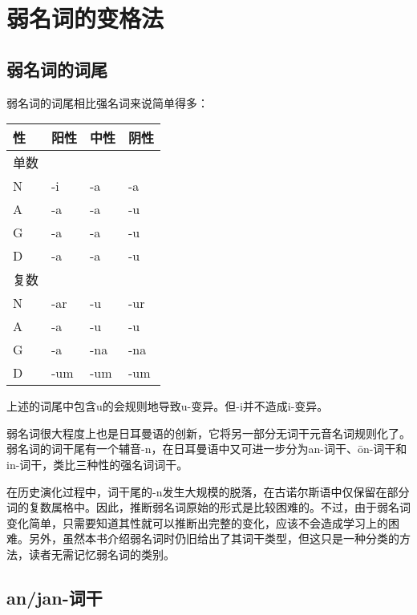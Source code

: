 \section{弱名词的变格法}
\label{弱名词的变格法}

\subsection{弱名词的词尾}
\label{弱名词的词尾}

弱名词的词尾相比强名词来说简单得多：

\begin{longtable}{llll}
  \toprule
  \textbf{性} & \textbf{阳性} & \textbf{中性} & \textbf{阴性} \\
  \midrule
  \endhead
  \bottomrule
  \endfoot
  单数         &             &             &             \\
  N          & -i          & -a          & -a          \\
  A          & -a          & -a          & -u          \\
  G          & -a          & -a          & -u          \\
  D          & -a          & -a          & -u          \\
  复数         &             &             &             \\
  N          & -ar         & -u          & -ur         \\
  A          & -a          & -u          & -u          \\
  G          & -a          & -na         & -na         \\
  D          & -um         & -um         & -um         \\
\end{longtable}

上述的词尾中包含u的会规则地导致u-变异。但-i并不造成i-变异。

弱名词很大程度上也是日耳曼语的创新，它将另一部分无词干元音名词规则化了。弱名词的词干尾有一个辅音-n，在日耳曼语中又可进一步分为an-词干、ōn-词干和in-词干，类比三种性的强名词词干。

在历史演化过程中，词干尾的-n发生大规模的脱落，在古诺尔斯语中仅保留在部分词的复数属格中。因此，推断弱名词原始的形式是比较困难的。不过，由于弱名词变化简单，只需要知道其性就可以推断出完整的变化，应该不会造成学习上的困难。另外，虽然本书介绍弱名词时仍旧给出了其词干类型，但这只是一种分类的方法，读者无需记忆弱名词的类别。

\subsection{an/jan-词干}
\label{an/jan-词干}

